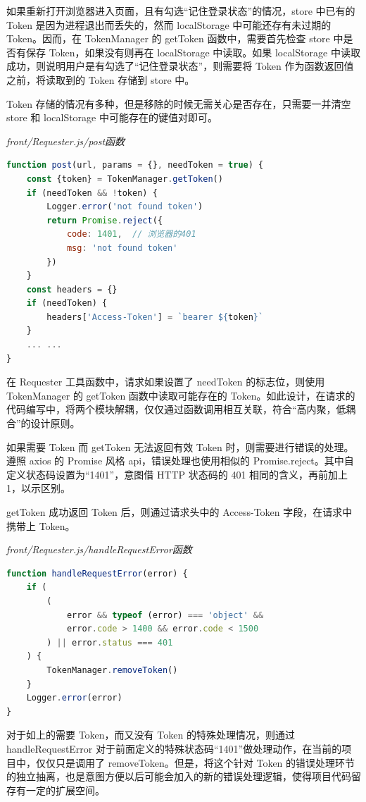 如果重新打开浏览器进入页面，且有勾选“记住登录状态”的情况，store 中已有的 Token 是因为进程退出而丢失的，然而 localStorage 中可能还存有未过期的 Token。因而，在 TokenManager 的 getToken 函数中，需要首先检查 store 中是否有保存 Token，如果没有则再在 localStorage 中读取。如果 localStorage 中读取成功，则说明用户是有勾选了“记住登录状态”，则需要将 Token 作为函数返回值之前，将读取到的 Token 存储到 store 中。

Token 存储的情况有多种，但是移除的时候无需关心是否存在，只需要一并清空 store 和 localStorage 中可能存在的键值对即可。

\noindent\textit{front/Requester.js/post函数}
\begin{lstlisting}[language=JavaScript]
function post(url, params = {}, needToken = true) {
    const {token} = TokenManager.getToken()
    if (needToken && !token) {
        Logger.error('not found token')
        return Promise.reject({
            code: 1401,  // 浏览器的401
            msg: 'not found token'
        })
    }
    const headers = {}
    if (needToken) {
        headers['Access-Token'] = `bearer ${token}`
    }
    ... ...
}
\end{lstlisting}

在 Requester 工具函数中，请求如果设置了 needToken 的标志位，则使用 TokenManager 的 getToken 函数中读取可能存在的 Token。如此设计，在请求的代码编写中，将两个模块解耦，仅仅通过函数调用相互关联，符合“高内聚，低耦合”的设计原则。

如果需要 Token 而 getToken 无法返回有效 Token 时，则需要进行错误的处理。遵照 axios 的 Promise 风格 api，错误处理也使用相似的 Promise.reject。其中自定义状态码设置为“1401”，意图借 HTTP 状态码的 401 相同的含义，再前加上 1，以示区别。

getToken 成功返回 Token 后，则通过请求头中的 Access-Token 字段，在请求中携带上 Token。

\noindent\textit{front/Requester.js/handleRequestError函数}
\begin{lstlisting}[language=JavaScript]
function handleRequestError(error) {
    if (
        (
            error && typeof (error) === 'object' &&
            error.code > 1400 && error.code < 1500
        ) || error.status === 401
    ) {
        TokenManager.removeToken()
    }
    Logger.error(error)
}
\end{lstlisting}

对于如上的需要 Token，而又没有 Token 的特殊处理情况，则通过 handleRequestError 对于前面定义的特殊状态码“1401”做处理动作，在当前的项目中，仅仅只是调用了 removeToken。但是，将这个针对 Token 的错误处理环节的独立抽离，也是意图方便以后可能会加入的新的错误处理逻辑，使得项目代码留存有一定的扩展空间。

